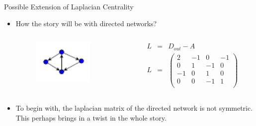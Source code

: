 \documentclass[10pt]{beamer}
\begin{document}
\begin{frame}{Possible Extension of Laplacian Centrality}
	\begin{itemize}
		\item How the story will be with directed networks?
		\begin{columns}
			\begin{column}{0.5\textwidth}
				\begin{center}
					\begin{figure}
						\includegraphics[width=0.85\textwidth]{images/directed-graph.pdf}
					\end{figure}
				\end{center}
			\end{column}
			\begin{column}{0.45\textwidth}  
				\begin{eqnarray*}
					L &=& D_{out} - A \\
					L &=& \begin{pmatrix}
						2 & -1& 0& -1 \\
						0 & 1& -1 & 0 \\
						-1 & 0& 1 & 0 \\
						0 & 0& -1 & 1 \\
					\end{pmatrix}
				\end{eqnarray*}
			\end{column}
		\end{columns}
		\item To begin with, the laplacian matrix of the directed network is not symmetric. This perhaps brings in a twist in the whole story.
	\end{itemize}
	
\end{frame}
\end{document}
